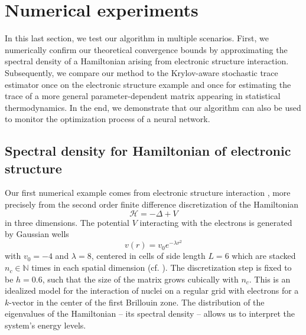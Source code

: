 
\section{Numerical experiments}
\label{sec:results}

\color{black}

In this last section, we test our algorithm in multiple scenarios. First, we numerically confirm our theoretical convergence bounds by approximating the spectral density of a Hamiltonian arising from electronic structure interaction. Subsequently, we compare our method to the Krylov-aware stochastic trace estimator \cite{chen-2023-krylovaware-stochastic} once on the electronic structure example and once for estimating the trace of a more general parameter-dependent matrix appearing in statistical thermodynamics. In the end, we demonstrate that our algorithm can also be used to monitor the optimization process of a neural network.

\subsection{Spectral density for Hamiltonian of electronic structure}
\label{subsec:hamiltonian}

Our first numerical example comes from electronic structure interaction \cite{lin-2017-randomized-estimation}, more precisely from the second order finite difference discretization of the Hamiltonian
\begin{equation}
    \mathcal{H} = - \Delta + V
    \label{equ:5-experiments-electronic-hamiltonian}
\end{equation}
in three dimensions. The potential $V$ interacting with the electrons is generated by Gaussian wells
\begin{equation}
    v(r) = v_0 e^{-\lambda r^2}
    \label{equ:5-experiments-gaussian-cell}
\end{equation}
with $v_0 = -4$ and $\lambda = 8$, centered in cells of side length $L=6$ which are stacked $n_c \in \mathbb{N}$ times in each spatial dimension (cf. ). The discretization step is fixed to be $h=0.6$, such that the size of the matrix grows cubically with $n_c$. This is an idealized model for the interaction of nuclei on a regular grid with electrons for a $k$-vector in the center of the first Brillouin zone. The distribution of the eigenvalues of the Hamiltonian -- its spectral density -- allows us to interpret the system's energy levels.

